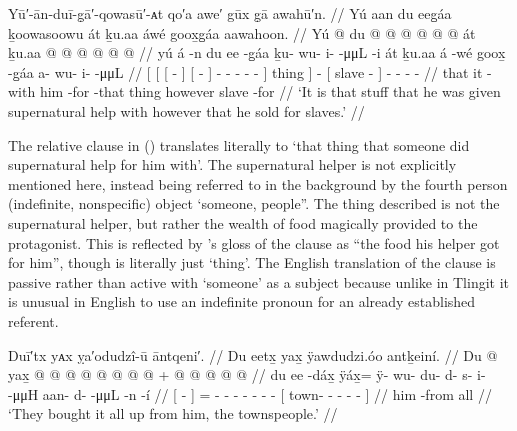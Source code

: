 \ex\label{ex:90-92-stuff-sold-for-slaves}%
%
\begingl
	\glpreamble	Yū′-ān-duī-g̣ā′-qowasū′-ᴀt qo′a awe′ gūx g̣ā awahū′n. //
	\glpreamble	Yú aan du eeg̱áa ḵoowasoowu át ḵu.aa áwé goox̱g̱áa aawahoon. //
	\gla	{} Yú {} {}  @ {} {}
				{} du  @ {} {}
				 @ {} @ {} @ {} @ {} @ {} {} át {}
		ḵu.aa
		 @ {}
		{}  @ {} {}
		 @ {} @ {} @ {} @ {} //
	\glb	{} yú {} {} á -n {}
				{} du ee -g̱áa {}
				ḵu- wu- i-  -μμL -i {} át {}
		ḵu.aa
		á -wé
		{} goox̱ -g̱áa {}
		a- wu- i-  -μμL //
	\glc	{}[  {}[ {}[  - {}]
				{}[   - {}]
				- - -  - - {}] thing {}]
		 -
		{}[ slave - {}]
		- - -  - //
	\gld	{} that {} {} it -with {}
				{} him {} -for {}
				 {} {} {} {} -that {} thing {}
		however
		 {}
		{} slave -for {}
		 {} {} {} {} //
	\glft	‘It is that stuff that he was given supernatural help with however that he sold for slaves.’
		//
\endgl
\xe

The relative clause  in (\lastx) translates literally to ‘that thing that someone did supernatural help for him with’.
The supernatural helper is not explicitly mentioned here, instead being referred to in the background by the fourth person (indefinite, nonspecific) object  ‘someone, people”.
The thing described is not the supernatural helper, but rather the wealth of food magically provided to the protagonist.
This is reflected by \citeauthor{swanton:1909}’s gloss of the clause as “the food his helper got for him”, though  is literally just ‘thing’.
The English translation of the clause is passive rather than active with ‘someone’ as a subject because unlike in Tlingit it is unusual in English to use an indefinite pronoun for an already established referent.

\ex\label{ex:90-93-townspeople-bought-it}%
%
\begingl
	\glpreamble	Duī′tx yᴀx ỵa′odudzî-ū āntqeni′. //
	\glpreamble	Du eetx̱ yax̱ ÿawdudzi.óo antḵeiní. //
	\gla	{} Du  @ {} {}
		yax̱ @  @ {} @ {} @ {} @ {} @ {} @ {} @ {} +
		{}  @ {} @ {} @ {} @ {} @ {} {} //
	\glb	{} du ee -dáx̱ {}
		ÿáx̱= ÿ- wu- du- d- s- i-  -μμH
		{} aan- d-  -μμL -n -í {} //
	\glc	{}[   - {}]
		= - - - - - -  -
		{}[ town- -  - - - {}] //
	\gld	{} him {} -from {}
		all  {} {} {} {} {} {} {}
		{}  {} {} {} {} {} {} //
	\glft	‘They bought it all up from him, the townspeople.’
		//
\endgl
\xe

